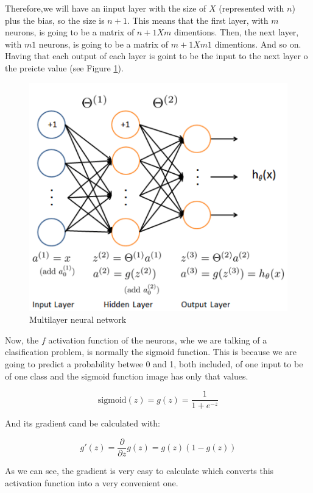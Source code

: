 \documentclass[12pt]{article}
\begin{document}
 Therefore,we will have an iinput layer with the size of $X$ (represented with $n$) plus the bias, so the size is $n + 1$. This means that the first layer, with $m$ neurons, is going to be a matrix of $n+1Xm$ dimentions. Then, the next layer, with $m1$ neurons, is going to be a matrix of $m+1Xm1$ dimentions. And so on. Having that each output of each layer is goint to be the input to the next layer o the preicte value (see Figure \ref{fig:Multilayer}).
 
\begin{figure}[ht]
\centering
\includegraphics[width=.4\textwidth]{Multilayer.png}
\caption{Multilayer neural network}
\label{fig:Multilayer}
\end{figure}

Now, the $f$ activation function of the neurons, whe we are talking of a clasification problem, is normally the sigmoid function. This is because we are going to predict a probability betwee 0 and 1, both included, of one input to be of one class and the sigmoid function image has only that values. 

\begin{equation}
\textrm{sigmoid}(z)=g(z)=\frac{1}{1+e^{-z}}
\end{equation}

And its gradient cand be calculated with:

\begin{equation}
g'(z)=\frac{\partial}{\partial z}g(z)=g(z)(1-g(z))
\end{equation}

As we can see, the gradient is very easy to calculate which converts this activation function into a very convenient one.
\end{document}
